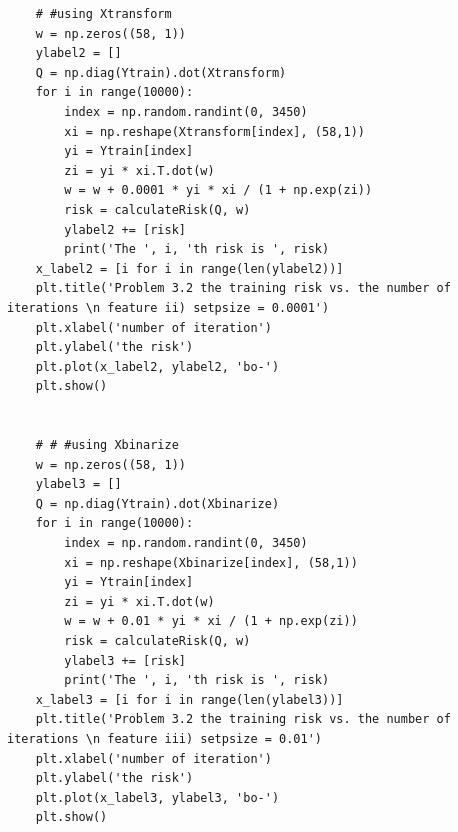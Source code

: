 \documentclass[11pt]{article}
\begin{document}
\begin{lstlisting}
	# #using Xtransform
	w = np.zeros((58, 1))
	ylabel2 = []
	Q = np.diag(Ytrain).dot(Xtransform)
	for i in range(10000):
		index = np.random.randint(0, 3450)	
		xi = np.reshape(Xtransform[index], (58,1))
		yi = Ytrain[index]
		zi = yi * xi.T.dot(w)
		w = w + 0.0001 * yi * xi / (1 + np.exp(zi))
		risk = calculateRisk(Q, w)
		ylabel2 += [risk]
		print('The ', i, 'th risk is ', risk)
	x_label2 = [i for i in range(len(ylabel2))]
	plt.title('Problem 3.2 the training risk vs. the number of iterations \n feature ii) setpsize = 0.0001')
	plt.xlabel('number of iteration')
	plt.ylabel('the risk')
	plt.plot(x_label2, ylabel2, 'bo-')
	plt.show()


	# # #using Xbinarize
	w = np.zeros((58, 1))
	ylabel3 = []
	Q = np.diag(Ytrain).dot(Xbinarize)
	for i in range(10000):
		index = np.random.randint(0, 3450)	
		xi = np.reshape(Xbinarize[index], (58,1))
		yi = Ytrain[index]
		zi = yi * xi.T.dot(w)
		w = w + 0.01 * yi * xi / (1 + np.exp(zi))
		risk = calculateRisk(Q, w)
		ylabel3 += [risk]
		print('The ', i, 'th risk is ', risk)
	x_label3 = [i for i in range(len(ylabel3))]
	plt.title('Problem 3.2 the training risk vs. the number of iterations \n feature iii) setpsize = 0.01')
	plt.xlabel('number of iteration')
	plt.ylabel('the risk')
	plt.plot(x_label3, ylabel3, 'bo-')
	plt.show()

\end{lstlisting}
\end{document}
